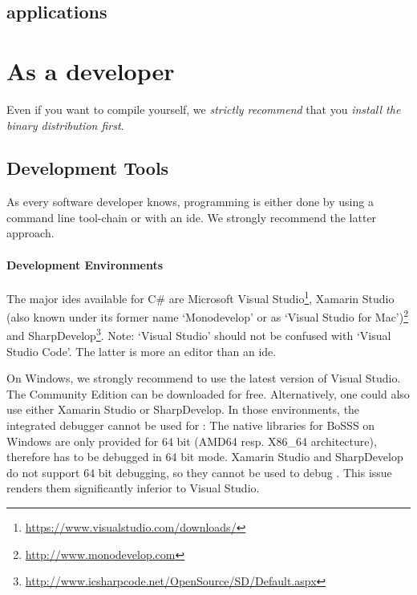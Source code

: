 \documentclass[a4paper,10pt]{report} %
\begin{document}
\subsection{\BoSSSpad{}}

\code{}

\subsection{\BoSSS{} applications}




\section{As a developer}
\label{sec:gettingStarted_developing}

Even if you want to compile \BoSSS{} yourself, we \emph{strictly recommend} that
you \emph{install the binary distribution first}.


\subsection{Development Tools}
As every software developer knows, programming is either done by using a 
command line tool-chain or with an \ac{ide}. We strongly recommend the latter 
approach.

\paragraph{Development Environments}
The major \ac{ide}s available for C\# are 
Microsoft Visual Studio\footnote{
\url{https://www.visualstudio.com/downloads/}},
Xamarin Studio (also known under its former name `Monodevelop' or as `Visual Studio for Mac')\footnote{
\url{http://www.monodevelop.com}}
and SharpDevelop\footnote{
\url{http://www.icsharpcode.net/OpenSource/SD/Default.aspx}}.
Note: `Visual Studio' should not be confused with `Visual Studio Code'. The latter is more an editor
than an \ac{ide}.

On Windows, we strongly recommend to use the latest version of Visual Studio.
The Community Edition can be downloaded for free.
Alternatively, one could also use either Xamarin Studio or SharpDevelop.
In those environments, the integrated debugger cannot be used for \BoSSS{}:
The native libraries for BoSSS on Windows are only provided for  
64 bit (AMD64 resp. X86\_64 architecture), therefore \BoSSS{} has to be debugged in 64 bit mode.
Xamarin Studio and SharpDevelop do not support 64 bit debugging, so they cannot be used to
debug \BoSSS{}.
This issue renders them significantly inferior to Visual Studio.
\end{document}
